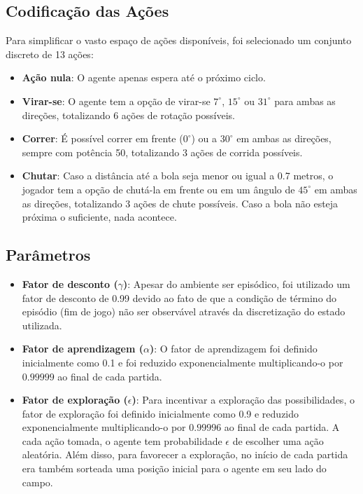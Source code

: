 \subsection{Codificação das Ações}

Para simplificar o vasto espaço de ações disponíveis, foi selecionado um conjunto discreto de 13 ações:

\begin{itemize}
	\item \textbf{Ação nula}: O agente apenas espera até o próximo ciclo.
	
	\item \textbf{Virar-se}: O agente tem a opção de virar-se $7^{\circ}$, $15^{\circ}$ ou $31^{\circ}$ para ambas as direções, totalizando 6 ações de rotação possíveis. 
	
	\item \textbf{Correr}: É possível correr em frente ($0^{\circ}$) ou a $30^{\circ}$ em ambas as direções, sempre com potência 50, totalizando 3 ações de corrida possíveis.
	
	\item \textbf{Chutar}: Caso a distância até a bola seja menor ou igual a 0.7 metros, o jogador tem a opção de chutá-la em frente ou em um ângulo de $45^{\circ}$ em ambas as direções, totalizando 3 ações de chute possíveis. Caso a bola não esteja próxima o suficiente, nada acontece.
\end{itemize}

\subsection{Parâmetros}

\begin{itemize}
	\item \textbf{Fator de desconto ($\gamma$)}: Apesar do ambiente ser episódico, foi utilizado um fator de desconto de 0.99 devido ao fato de que a condição de término do episódio (fim de jogo) não ser observável através da discretização do estado utilizada.  
	
	\item \textbf{Fator de aprendizagem ($\alpha$)}: O fator de aprendizagem foi definido inicialmente como 0.1 e foi reduzido exponencialmente multiplicando-o por $0.99999$ ao final de cada partida. 
	
	\item \textbf{Fator de exploração ($\epsilon$)}: Para incentivar a exploração das possibilidades, o fator de exploração foi definido inicialmente como 0.9 e reduzido exponencialmente multiplicando-o por $0.99996$ ao final de cada partida. A cada ação tomada, o agente tem probabilidade $\epsilon$ de escolher uma ação aleatória. Além disso, para favorecer a exploração, no início de cada partida era também sorteada uma posição inicial para o agente em seu lado do campo.
\end{itemize}

